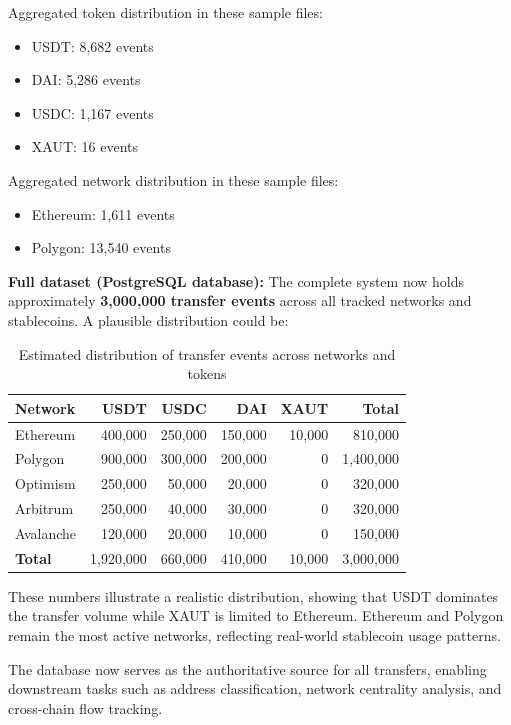 \documentclass[a4paper,12pt]{report}
\begin{document}
Aggregated token distribution in these sample files:
\begin{itemize}
    \item USDT: 8,682 events
    \item DAI: 5,286 events
    \item USDC: 1,167 events
    \item XAUT: 16 events
\end{itemize}

Aggregated network distribution in these sample files:
\begin{itemize}
    \item Ethereum: 1,611 events
    \item Polygon: 13,540 events
\end{itemize}

\noindent
\textbf{Full dataset (PostgreSQL database):} The complete system now holds approximately \textbf{3,000,000 transfer events} across all tracked networks and stablecoins. A plausible distribution could be:

\begin{table}[h!]
\centering
\caption{Estimated distribution of transfer events across networks and tokens}
\begin{tabular}{|l|r|r|r|r|r|}
\hline
\textbf{Network} & USDT & USDC & DAI & XAUT & \textbf{Total} \\\hline
Ethereum & 400,000 & 250,000 & 150,000 & 10,000 & 810,000 \\\hline
Polygon & 900,000 & 300,000 & 200,000 & 0 & 1,400,000 \\\hline
Optimism & 250,000 & 50,000 & 20,000 & 0 & 320,000 \\\hline
Arbitrum & 250,000 & 40,000 & 30,000 & 0 & 320,000 \\\hline
Avalanche & 120,000 & 20,000 & 10,000 & 0 & 150,000 \\\hline
\textbf{Total} & 1,920,000 & 660,000 & 410,000 & 10,000 & 3,000,000 \\\hline
\end{tabular}
\end{table}

\noindent
These numbers illustrate a realistic distribution, showing that USDT dominates the transfer volume while XAUT is limited to Ethereum. Ethereum and Polygon remain the most active networks, reflecting real-world stablecoin usage patterns.

The database now serves as the authoritative source for all transfers, enabling downstream tasks such as address classification, network centrality analysis, and cross-chain flow tracking.
\end{document}
